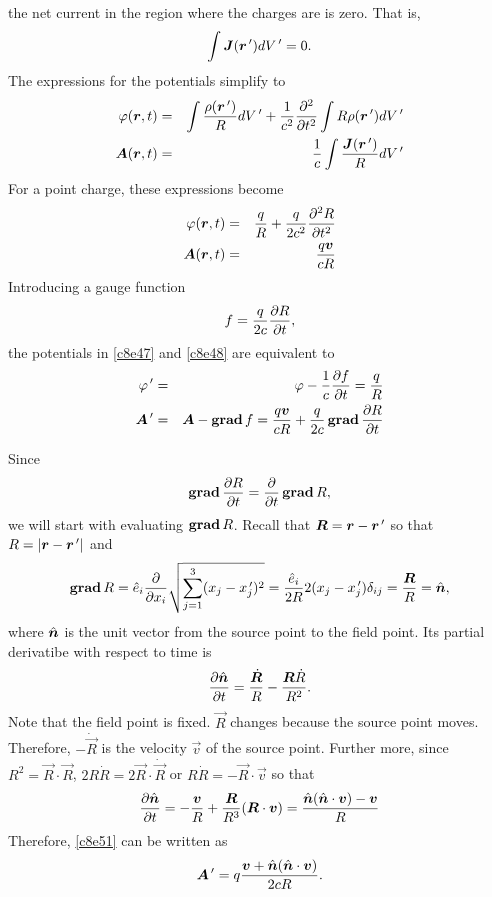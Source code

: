 \begin{enumerate}
the net current in the region where the charges are is zero. That is,
\[
\int\bm{J}(\bm{r}^{\,\prime})dV^{\,\prime} = 0.
\]
The expressions for the potentials simplify to
\begin{eqnarray}
\varphi(\bm{r}, t) &=& \int\frac{\rho(\bm{r}^{\,\prime})}{R}dV^{\,\prime} + \frac{1}{c^2}
\frac{\partial^2}{\partial t^2}\int R\rho(\bm{r}^{\,\prime})dV^{\,\prime} \label{c8e45} \\
\bm{A}(\bm{r}, t) &=& \frac{1}{c}\int\frac{\bm{J}(\bm{r}^{\,\prime})}{R}dV^{\,\prime}
\label{c8e46}
\end{eqnarray}
For a point charge, these expressions become
\begin{eqnarray}
\varphi(\bm{r}, t) &=& \frac{q}{R} + \frac{q}{2c^2}\frac{\partial^2{R}}{\partial{t}^2} \label{c8e47}\\
\bm{A}(\bm{r}, t) &=& \frac{q\bm{v}}{cR} \label{c8e48}
\end{eqnarray}
Introducing a gauge function
\begin{equation}\label{c8e49}
f = \frac{q}{2c}\frac{\partial{R}}{\partial{t}},
\end{equation}
the potentials in \eqref{c8e47} and \eqref{c8e48} are equivalent to
\begin{eqnarray}
\varphi^{\,\prime} &=& \varphi - \frac{1}{c}\frac{\partial{f}}{\partial{t}} = \frac{q}{R} \label{c8e50} \\
\bm{A}^{\,\prime} &=& \bm{A} - \operatorname{\textbf{grad}}{f} = \frac{q\bm{v}}{cR} + \frac{q}{2c}\operatorname{\textbf{grad}}
\frac{\partial{R}}{\partial{t}} \label{c8e51}
\end{eqnarray}

Since
\[
\operatorname{\textbf{grad}}\frac{\partial{R}}{\partial{t}} = \frac{\partial}{\partial t}\operatorname{\textbf{grad}}{R},
\]
we will start with evaluating $\operatorname{\textbf{grad}} R$. Recall that $\bm{R} = \bm{r} - 
\bm{r}^{\,\prime}$ so that $R = |\bm{r} - \bm{r}^{\,\prime}|$ and
\[
\operatorname{\textbf{grad}} R = \hat{e}_i\frac{\partial}{\partial x_i}
\sqrt{\sum_{j=1}^3(x_j - x_j^{\,\prime})^2} = 
\frac{\hat{e}_i}{2R}2(x_j-x_j^{\,\prime})\delta_{ij} = \frac{\bm{R}}{R} = \hat{\bm{n}},
\]
where $\hat{\bm{n}}$ is the unit vector from the source point to the field point. Its
partial derivatibe with respect to time is
\[
\frac{\partial{\hat{\bm{n}}}}{\partial{t}} = \frac{\dot{\bm{R}}}{R} - \frac{\bm{R}\dot{R}}{R^2}.
\]
Note that the field point is fixed. $\vec{R}$ changes because the source point
moves. Therefore, $-\dot{\vec{R}}$ is the velocity $\vec{v}$ of the source 
point. Further more, since $R^2 = \vec{R}\cdot\vec{R}$, $2R\dot{R} = 2\vec{R}
\cdot\dot{\vec{R}}$ or $R\dot{R} = -\vec{R}\cdot\vec{v}$ so that
\begin{equation}\label{c8e52}
\frac{\partial{\hat{\bm{n}}}}{\partial{t}} = -\frac{\bm{v}}{R} + \frac{\bm{R}}{R^3}(\bm{R}\cdot\bm{v})
= \frac{\hat{\bm{n}}(\hat{\bm{n}}\cdot\bm{v}) - \bm{v}}{R}
\end{equation}
Therefore, \eqref{c8e51} can be written as
\begin{equation}\label{c8e53}
\bm{A}^{\,\prime} = q\frac{\bm{v} + \hat{\bm{n}}(\hat{\bm{n}}\cdot\bm{v})}{2cR}.
\end{equation}


\end{enumerate}

